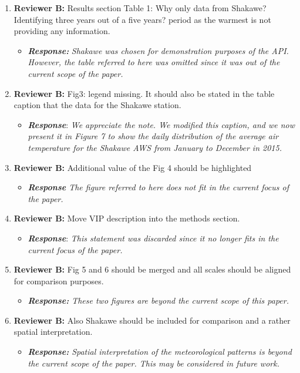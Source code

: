 \documentclass[a4paper, 12pt, conference]{ieeeconf}      %
\begin{document}
\begin{enumerate}
  \item \textbf{Reviewer B:}  Results section Table 1: Why only data from Shakawe?  Identifying three years out of a five years? period as the warmest is not providing any information. 
   \begin{itemize}
  	\item \emph{\textbf{Response:}} \emph{Shakawe was chosen for demonstration purposes of the API. However, the table referred to here was omitted since it was out of the current scope of the paper.}
  \end{itemize}

   
   \item \textbf{Reviewer B:}  Fig3: legend missing. It should also be stated in the table caption that the data for the Shakawe station. 
 	\begin{itemize}
  	\item \textbf{\emph{Response}}: \emph{We appreciate the note. We modified this   caption, and we now present it in Figure 7 to show the daily distribution of the average air temperature for the Shakawe AWS from January to December in 2015.}
  \end{itemize}

  \item \textbf{Reviewer B:}  Additional value of the Fig 4 should be highlighted 
  \begin{itemize}
  	\item \emph{\textbf{Response} The figure referred to here  does not fit in the current focus of the paper.}
  \end{itemize}

  
  \item \textbf{Reviewer B:}  Move VIP description into the methods section. 
  	\begin{itemize}
  	\item \textbf{\emph{Response}}: \emph{This statement was discarded since it no longer fits in the current focus of the paper.}
  \end{itemize}

  \item \textbf{Reviewer B:}  Fig 5 and 6 should be merged and all scales should be aligned for comparison purposes. 
   \begin{itemize}
  	\item \emph{\textbf{Response:} These two figures are beyond the current scope of this paper.}
    \end{itemize}
  
  \item \textbf{Reviewer B:}  Also Shakawe should be included for comparison and  a rather spatial interpretation.
   \begin{itemize}
  	\item \emph{\textbf{Response:} Spatial interpretation of the meteorological patterns is beyond the current scope of the paper. This may be considered in future work.}


\end{itemize}
\end{enumerate}
\end{document}
